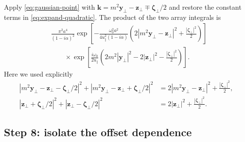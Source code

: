 \documentclass[11pt]{article}
\newcommand{\by}{\bm{y}}
\newcommand{\bz}{\bm{z}}
\newcommand{\bk}{\bm{k}}
\newcommand{\bzeta}{\boldsymbol{\zeta}}
\begin{document}
Apply \eqref{eq:gaussian-point} with
$\bk=m^2\by_\perp-\bz_\perp\mp\bzeta_\perp/2$ and restore the
constant terms in \eqref{eq:expand-quadratic}. The product of the two
array integrals is
\begin{align}
&\frac{\pi^2a^4}{(1-i\alpha)^2}
\exp\!\left[-\frac{\omega_0^2a^2}
{4u_\parallel^2(1-i\alpha)}
\left(2|m^2\by_\perp-\bz_\perp|^2
+\frac{|\bzeta_\perp|^2}{2}\right)\right]
\nonumber\\
&\qquad\times
\exp\!\left[\frac{i\omega_0}{2u_\parallel}
\left(2m^2|\by_\perp|^2-2|\bz_\perp|^2
-\frac{|\bzeta_\perp|^2}{2}\right)\right].
\label{eq:gaussian-product}
\end{align}
Here we used explicitly
\begin{align}
|m^2\by_\perp-\bz_\perp-\bzeta_\perp/2|^2
+|m^2\by_\perp-\bz_\perp+\bzeta_\perp/2|^2
&=2|m^2\by_\perp-\bz_\perp|^2+\frac{|\bzeta_\perp|^2}{2},\\
|\bz_\perp+\bzeta_\perp/2|^2
+|\bz_\perp-\bzeta_\perp/2|^2
&=2|\bz_\perp|^2+\frac{|\bzeta_\perp|^2}{2}.
\end{align}

\subsection{Step 8: isolate the offset dependence}
\end{document}
